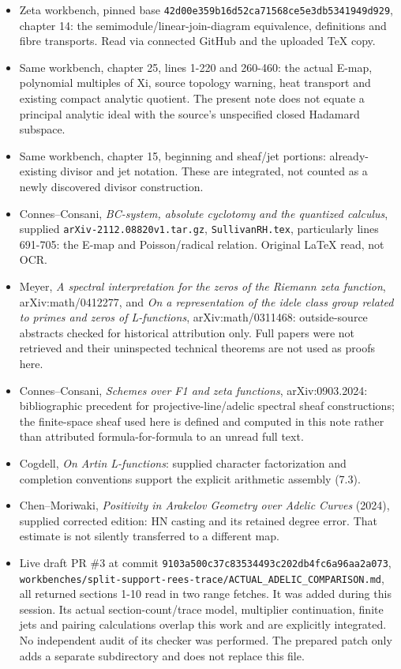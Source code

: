 \documentclass[
]{article}
\begin{document}
\begin{itemize}
\item
  Zeta workbench, pinned base
  \texttt{42d00e359b16d52ca71568ce5e3db5341949d929}, chapter 14: the
  semimodule/linear-join-diagram equivalence, definitions and fibre
  transports. Read via connected GitHub and the uploaded TeX copy.
\item
  Same workbench, chapter 25, lines 1-220 and 260-460: the actual E-map,
  polynomial multiples of Xi, source topology warning, heat transport
  and existing compact analytic quotient. The present note does not
  equate a principal analytic ideal with the source's unspecified closed
  Hadamard subspace.
\item
  Same workbench, chapter 15, beginning and sheaf/jet portions:
  already-existing divisor and jet notation. These are integrated, not
  counted as a newly discovered divisor construction.
\item
  Connes--Consani, \emph{BC-system, absolute cyclotomy and the quantized
  calculus}, supplied \texttt{arXiv-2112.08820v1.tar.gz},
  \texttt{SullivanRH.tex}, particularly lines 691-705: the E-map and
  Poisson/radical relation. Original LaTeX read, not OCR.
\item
  Meyer, \emph{A spectral interpretation for the zeros of the Riemann
  zeta function}, arXiv:math/0412277, and \emph{On a representation of
  the idele class group related to primes and zeros of L-functions},
  arXiv:math/0311468: outside-source abstracts checked for historical
  attribution only. Full papers were not retrieved and their uninspected
  technical theorems are not used as proofs here.
\item
  Connes--Consani, \emph{Schemes over F1 and zeta functions},
  arXiv:0903.2024: bibliographic precedent for projective-line/adelic
  spectral sheaf constructions; the finite-space sheaf used here is
  defined and computed in this note rather than attributed
  formula-for-formula to an unread full text.
\item
  Cogdell, \emph{On Artin L-functions}: supplied character factorization
  and completion conventions support the explicit arithmetic assembly
  (7.3).
\item
  Chen--Moriwaki, \emph{Positivity in Arakelov Geometry over Adelic
  Curves} (2024), supplied corrected edition: HN casting and its
  retained degree error. That estimate is not silently transferred to a
  different map.
\item
  Live draft PR \#3 at commit
  \texttt{9103a500c37c83534493c202db4fc6a96aa2a073},
  \texttt{workbenches/split-support-rees-trace/ACTUAL\_ADELIC\_COMPARISON.md},
  all returned sections 1-10 read in two range fetches. It was added
  during this session. Its actual section-count/trace model, multiplier
  continuation, finite jets and pairing calculations overlap this work
  and are explicitly integrated. No independent audit of its checker was
  performed. The prepared patch only adds a separate subdirectory and
  does not replace this file.
\end{itemize}
\end{document}
